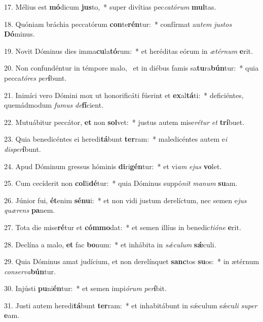 17. Mélius est \textbf{mó}dicum \textbf{jus}to,~*  super divítias pec\textit{ca}\textit{tó}\textit{rum} \textbf{mul}tas.\

18. Quóniam bráchia peccatórum \textbf{con}te\textbf{rén}tur:~*  confírmat au\textit{tem} \textit{jus}\textit{tos} \textbf{Dó}minus.\

19. Novit Dóminus dies imma\textbf{cu}la\textbf{tó}rum:~*  et heréditas eórum in \textit{æ}\textit{tér}\textit{num} \textbf{e}rit.\

20. Non confundéntur in témpore malo, \dag\  et in diébus famis sa\textbf{tu}ra\textbf{bún}tur:~*  quia pecca\textit{tó}\textit{res} \textit{per}\textbf{í}bunt.\

21. Inimíci vero Dómini mox ut honorificáti fúerint et \textbf{ex}al\textbf{tá}ti:~*  deficiéntes, quemádmodum \textit{fu}\textit{mus} \textit{de}\textbf{fí}cient.\

22. Mutuábitur peccátor, \textbf{et} non \textbf{sol}vet:~*  justus autem mise\textit{ré}\textit{tur} \textit{et} \textbf{trí}buet.\

23. Quia benedicéntes ei heredi\textbf{tá}bunt \textbf{ter}ram:~*  maledicéntes autem e\textit{i} \textit{dis}\textit{per}\textbf{í}bunt.\

24. Apud Dóminum gressus hóminis \textbf{di}ri\textbf{gén}tur:~*  et vi\textit{am} \textit{e}\textit{jus} \textbf{vo}let.\

25. Cum cecíderit non \textbf{col}li\textbf{dé}tur:~*  quia Dóminus suppó\textit{nit} \textit{ma}\textit{num} \textbf{su}am.\

26. Júnior fui, \textbf{ét}enim \textbf{sé}\textbf{nu}i:~*  et non vidi justum derelíctum, nec semen e\textit{jus} \textit{quæ}\textit{rens} \textbf{pa}nem.\

27. Tota die mise\textbf{ré}tur et \textbf{cóm}\textbf{mo}dat:~*  et semen illíus in benedic\textit{ti}\textit{ó}\textit{ne} \textbf{e}rit.\

28. Declína a malo, \textbf{et} fac \textbf{bo}num:~*  et inhábita in \textit{sǽ}\textit{cu}\textit{lum} \textbf{sǽ}culi.\

29. Quia Dóminus amat judícium, et non derelínquet \textbf{sanc}tos \textbf{su}os:~*  in ætérnum \textit{con}\textit{ser}\textit{va}\textbf{bún}tur.\

30. Injústi \textbf{pu}ni\textbf{én}tur:~*  et semen impi\textit{ó}\textit{rum} \textit{per}\textbf{í}bit.\

31. Justi autem heredi\textbf{tá}bunt \textbf{ter}ram:~*  et inhabitábunt in sǽculum sǽcu\textit{li} \textit{su}\textit{per} \textbf{e}am.\

